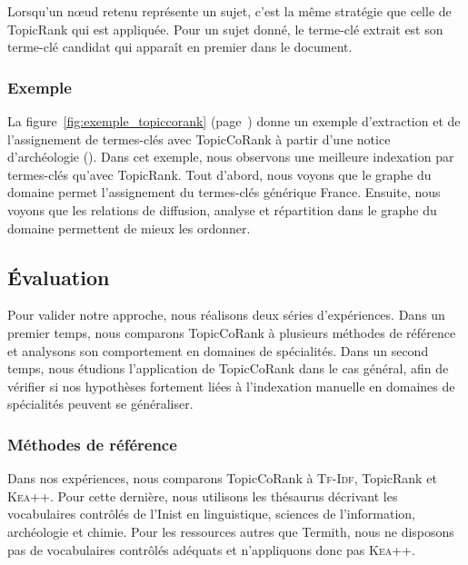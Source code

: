         Lorsqu'un n\oe{}ud retenu représente un sujet, c'est la même stratégie
        que celle de TopicRank qui est appliquée. Pour un sujet donné, le
        terme-clé extrait est son terme-clé candidat qui apparaît en premier
        dans le document.

      \subsubsection{Exemple}
      \label{subsubsec:main-domain_specific_keyphrase_annotation-supervised_automatic_keyphrase_extraction-topiccorank-exemple}
        La figure~\ref{fig:exemple_topiccorank}
        (page~\pageref{fig:exemple_topiccorank}) donne un exemple d'extraction
        et de l'assignement de
        termes-clés avec TopicCoRank à partir d'une notice d'archéologie
        (). Dans cet exemple,
        nous observons une meilleure indexation par termes-clés qu'avec
        TopicRank. Tout d'abord, nous voyons que le graphe du domaine permet
        l'assignement du termes-clés générique \og{}France\fg{}. Ensuite, nous
        voyons que les relations de \og{}diffusion\fg{}, \og{}analyse\fg{} et
        \og{}répartition\fg{} dans le graphe du domaine permettent de mieux les
        ordonner.
        

    \subsection{Évaluation}
    \label{subsec:main-domain_specific_keyphrase_annotation-supervised_automatic_keyphrase_annotation-evaluation}
      Pour valider notre approche, nous réalisons deux séries d'expériences.
      Dans un premier temps, nous comparons TopicCoRank à plusieurs méthodes de
      référence et analysons son comportement en domaines de spécialités. Dans
      un second temps, nous étudions l'application de TopicCoRank dans le cas
      général, afin de vérifier si nos hypothèses fortement liées à l'indexation
      manuelle en domaines de spécialités peuvent se généraliser.

      \subsubsection{Méthodes de référence}
      \label{subsubsec:main-domain_specific_keyphrase_annotation-supervised_automatic_keyphrase_annotation-evaluation-baselines}
        Dans nos expériences, nous comparons TopicCoRank à \textsc{Tf-Idf},
        TopicRank et \textsc{Kea++}. Pour cette dernière, nous utilisons les
        thésaurus décrivant les vocabulaires contrôlés de l'Inist en
        linguistique, sciences de l'information, archéologie et chimie. Pour les
        ressources autres que Termith, nous ne disposons pas de vocabulaires
        contrôlés adéquats et n'appliquons donc pas \textsc{Kea++}.

